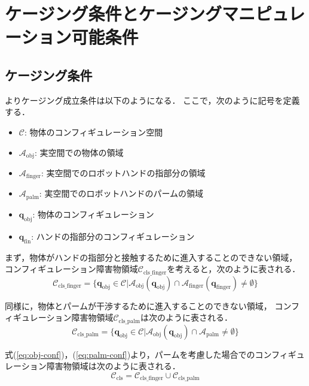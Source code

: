 \documentclass[a4paper,twoside,12pt,papersize, dvipdfmx]{iirthesis}
\begin{document}
\section{ケージング条件とケージングマニピュレーション可能条件}\label{sec::sicm::caging}
\subsection*{ケージング条件}
\cite{yokoi2010}よりケージング成立条件は以下のようになる．
ここで，次のように記号を定義する．
\begin{itemize}
\item $\mathcal{C}$: 物体のコンフィギュレーション空間
\item $\mathcal{A}_{\mathrm{obj}}$: 実空間での物体の領域
\item $\mathcal{A}_{\mathrm{finger}}$: 実空間でのロボットハンドの指部分の領域
\item $\mathcal{A}_{\mathrm{palm}}$: 実空間でのロボットハンドのパームの領域
\item $\bm{q}_{\mathrm{obj}}$: 物体のコンフィギュレーション
\item $\bm{q}_{\mathrm{fin}}$: ハンドの指部分のコンフィギュレーション
\end{itemize}

まず，物体がハンドの指部分と接触するために進入することのできない領域，
コンフィギュレーション障害物領域$\mathcal{C}_{\mathrm{cls}\_\mathrm{finger}}$を考えると，次のように表される．
\begin{equation}
\mathcal{C}_{\mathrm{cls\_finger}} =
\{\bm{q}_{\mathrm{obj}} \in \mathcal{C} | \mathcal{A}_{\mathrm{obj}}(\bm{q}_{\mathrm{obj}})
\cap \mathcal{A}_{\mathrm{finger}}(\bm{q}_{\mathrm{finger}}) \not= \emptyset\}
\label{eq:obj-conf}
\end{equation}

同様に，物体とパームが干渉するために進入することのできない領域，
コンフィギュレーション障害物領域$\mathcal{C}_{\mathrm{cls\_palm}}$は次のように表される．
\begin{equation}
\mathcal{C}_{\mathrm{cls\_palm}} = \{\bm{q}_{\mathrm{obj}} \in \mathcal{C} | \mathcal{A}_{\mathrm{obj}}(\bm{q}_{\mathrm{obj}}) \cap \mathcal{A}_{\mathrm{palm}} \neq \emptyset\}
\label{eq:palm-conf}
\end{equation}

式(\ref{eq:obj-conf})，(\ref{eq:palm-conf})より，パームを考慮した場合でのコンフィギュレーション障害物領域は次のように表される．
\begin{equation}
\mathcal{C}_{\mathrm{cls}} = \mathcal{C}_{\mathrm{cls\_finger}} \cup  \mathcal{C}_{\mathrm{cls\_palm}}
\end{equation}
\end{document}
